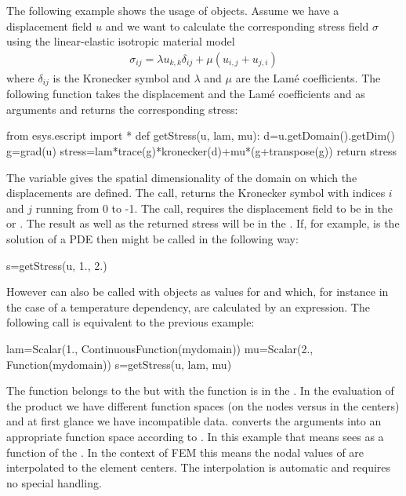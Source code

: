 The following example shows the usage of \Data objects. Assume we have a
displacement field $u$ and we want to calculate the corresponding stress field
$\sigma$ using the linear-elastic isotropic material model
\begin{eqnarray}\label{eq: linear elastic stress}
\sigma_{ij}=\lambda u_{k,k} \delta_{ij} + \mu ( u_{i,j} + u_{j,i})
\end{eqnarray}
where $\delta_{ij}$ is the Kronecker symbol and
$\lambda$ and $\mu$ are the Lam\'e coefficients. The following function
takes the displacement  and the Lam\'e coefficients  and 
as arguments and returns the corresponding stress:
\begin{python}
  from esys.escript import *
  def getStress(u, lam, mu):
    d=u.getDomain().getDim()
    g=grad(u)
    stress=lam*trace(g)*kronecker(d)+mu*(g+transpose(g))
    return stress
\end{python}
The variable  gives the spatial dimensionality of the domain on which
the displacements are defined.
The  call, returns the Kronecker symbol with indices $i$ and $j$ running
from 0 to -1.
The  call, requires the displacement field  to be in
the  or \ContinuousFunction.
The result  as well as the returned stress will be in the \Function.
If, for example,  is the solution of a PDE then  might
be called in the following way:
\begin{python}
  s=getStress(u, 1., 2.)
\end{python}
However  can also be called with \Data objects as values for
 and  which, for instance in the case of a temperature
dependency, are calculated by an expression.
The following call is equivalent to the previous example:
\begin{python}
  lam=Scalar(1., ContinuousFunction(mydomain))
  mu=Scalar(2., Function(mydomain))
  s=getStress(u, lam, mu)
\end{python}
%
The function  belongs to the \ContinuousFunction but with  the
function  is in the \Function.
In the evaluation of the product  we have different function
spaces (on the nodes versus in the centers) and at first glance we have incompatible data.
\escript converts the arguments into an appropriate function space according
to .
In this example that means \escript sees  as a function of the \Function.
In the context of FEM this means the nodal values of  are
interpolated to the element centers.
The interpolation is automatic and requires no special handling.

